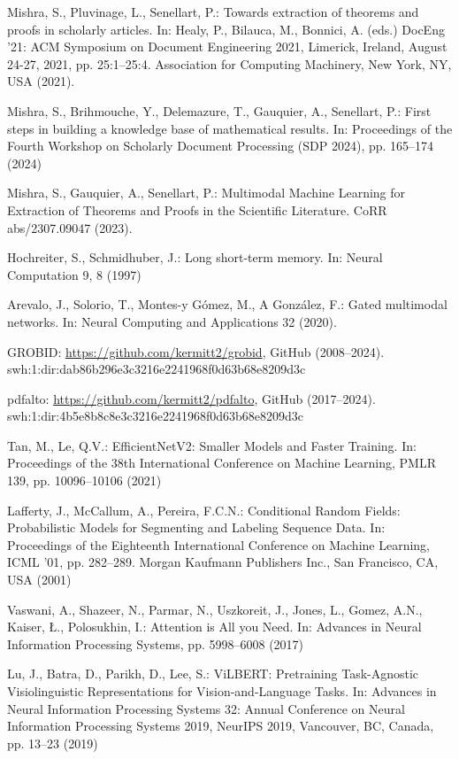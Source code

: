 \documentclass[runningheads]{llncs}
\begin{document}
%
\begin{thebibliography}{10}
Mishra, S., Pluvinage, L., Senellart, P.: Towards extraction of theorems and proofs in scholarly articles. In: Healy, P., Bilauca, M., Bonnici, A. (eds.) DocEng '21: ACM Symposium on Document Engineering 2021, Limerick, Ireland, August 24-27, 2021, pp. 25:1--25:4. Association for Computing Machinery, New York, NY, USA (2021). 

Mishra, S., Brihmouche, Y., Delemazure, T., Gauquier, A., Senellart, P.: First steps in building a knowledge base of mathematical results. In: Proceedings of the Fourth Workshop on Scholarly Document Processing (SDP 2024), pp. 165--174 (2024)

Mishra, S., Gauquier, A., Senellart, P.: Multimodal Machine Learning for Extraction of Theorems and Proofs in the Scientific Literature. CoRR abs/2307.09047 (2023). 

Hochreiter, S., Schmidhuber, J.:  Long short-term memory. In: Neural Computation 9, 8 (1997)

Arevalo, J., Solorio, T., Montes-y Gómez, M., A González, F.: Gated multimodal networks. In: Neural Computing and Applications 32 (2020). 

GROBID: \url{https://github.com/kermitt2/grobid}, GitHub (2008--2024). swh:1:dir:dab86b296e3c3216e2241968f0d63b68e8209d3c

pdfalto: \url{https://github.com/kermitt2/pdfalto}, GitHub (2017--2024). swh:1:dir:4b5e8b8c8e3c3216e2241968f0d63b68e8209d3c

Tan, M., Le, Q.V.: EfficientNetV2: Smaller Models and Faster Training. In: Proceedings of the 38th International Conference on Machine Learning, PMLR 139, pp. 10096--10106 (2021)

Lafferty, J., McCallum, A., Pereira, F.C.N.: Conditional Random Fields: Probabilistic Models for Segmenting and Labeling Sequence Data. In: Proceedings of the Eighteenth International Conference on Machine Learning, ICML '01, pp. 282--289. Morgan Kaufmann Publishers Inc., San Francisco, CA, USA (2001)

Vaswani, A., Shazeer, N., Parmar, N., Uszkoreit, J., Jones, L., Gomez, A.N., Kaiser, Ł., Polosukhin, I.: Attention is All you Need. In: Advances in Neural Information Processing Systems, pp. 5998--6008 (2017)

Lu, J., Batra, D., Parikh, D., Lee, S.: ViLBERT: Pretraining Task-Agnostic Visiolinguistic Representations for Vision-and-Language Tasks. In: Advances in Neural Information Processing Systems 32: Annual Conference on Neural Information Processing Systems 2019, NeurIPS 2019, Vancouver, BC, Canada, pp. 13--23 (2019)

\end{thebibliography}
\end{document}
